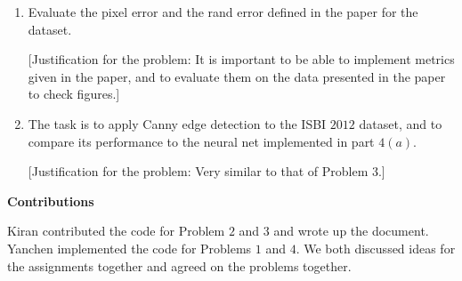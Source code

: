 \documentclass[12pt]{article}
\begin{document}
\begin{enumerate}
\item Evaluate the pixel error and the rand error defined in the paper for the dataset. 

[Justification for the problem: It is important to be able to implement metrics given in the paper, and to evaluate them on the data presented in the paper to check figures.]

\item The task is to apply Canny edge detection to the ISBI $2012$ dataset, and to compare its performance to the neural net implemented in part $4(a)$. 

[Justification for the problem: Very similar to that of Problem $3$.]

\end{enumerate}



\vspace{0.3in}

\large\textbf{Contributions}

Kiran contributed the code for Problem $2$ and $3$ and wrote up the document. 
Yanchen implemented the code for Problems $1$ and $4$. We both discussed ideas for the assignments together and agreed on the problems together.
\end{document}

